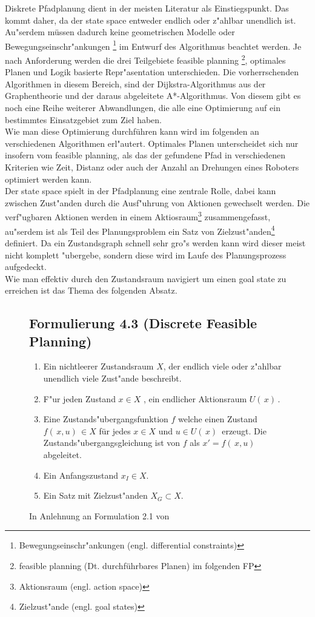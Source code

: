 Diskrete Pfadplanung dient in der meisten Literatur als Einstiegspunkt. Das kommt daher, da der state space entweder endlich oder z"ahlbar unendlich ist.\\
Au"serdem müssen dadurch keine geometrischen Modelle oder Bewegungseinschr"ankungen \footnote{Bewegungseinschr"ankungen (engl. differential constraints)} im Entwurf des Algorithmus beachtet werden.
Je nach Anforderung werden die drei Teilgebiete feasible planning \footnote{feasible planning (Dt. durchführbares Planen) im folgenden FP}, optimales Planen und Logik basierte Repr"asentation unterschieden. Die vorherrschenden Algorithmen in diesem Bereich, sind der Dijkstra-Algorithmus aus der Graphentheorie und der daraus abgeleitete A*-Algorithmus. Von diesem gibt es noch eine Reihe weiterer Abwandlungen, die alle eine Optimierung auf ein bestimmtes Einsatzgebiet zum Ziel haben.\cite[~S. 27]{Lav06} \\
Wie man diese Optimierung durchführen kann wird im folgenden an verschiedenen Algorithmen erl"autert. Optimales Planen unterscheidet sich nur insofern vom feasible planning, als das der gefundene Pfad in verschiedenen Kriterien wie Zeit, Distanz oder auch der Anzahl an Drehungen eines Roboters optimiert werden kann.\cite[~S. 43]{Lav06} \\
Der state space spielt in der Pfadplanung eine zentrale Rolle, dabei kann zwischen Zust"anden durch die Ausf"uhrung von Aktionen gewechselt werden. Die verf"ugbaren Aktionen werden in einem Aktiosraum\footnote{Aktionsraum (engl. action space) } zusammengefasst, au"serdem ist als Teil des Planungsproblem ein Satz von Zielzust"anden\footnote{Zielzust"ande (engl. goal states)} definiert. 
Da ein Zustandsgraph schnell sehr gro"s werden kann wird dieser meist nicht komplett "ubergebe, sondern diese wird im Laufe des Planungsprozess aufgedeckt.
\cite[~S. 43]{Lav06} \\
Wie man effektiv durch den Zustandsraum navigiert um einen goal state zu erreichen ist das Thema des folgenden Absatz.
\begin{figure}
\centering
\subsection*{Formulierung 4.3 (Discrete Feasible Planning)}
\begin{enumerate}
	\item Ein nichtleerer Zustandsraum $X$, der endlich viele oder z"ahlbar unendlich viele Zust"ande beschreibt.  
	\item F"ur jeden Zustand $x \in X$ , ein endlicher Aktionsraum $U( \, x) \,$.
	\item Eine Zustands"ubergangsfunktion $f$ welche einen Zustand  $f( \, x,u) \, \in X$ für jedes $x \in X$  und $u \in U( \, x) \,$ erzeugt. Die Zustands"ubergangsgleichung ist von $f$ als $x' = f( \, x,u )\, $ abgeleitet.
	\item Ein Anfangszustand $ x_{I} \in X$.
	\item Ein Satz mit Zielzust"anden $X_{G} \subset X$.
\end{enumerate}
\caption{In Anlehnung an Formulation 2.1 von \cite[~S. 29]{Lav06}}
\label{lav03}
\end{figure}
